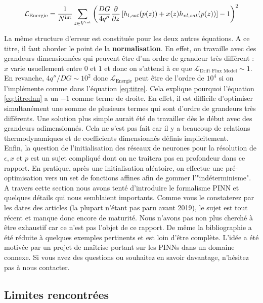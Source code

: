 \begin{equation}
    \mathcal{L}_{\text{Energie}} =\frac{1}{N^{\text{int}}}\sum_{z\in V^{\text{int}}} \left( \frac{DG}{4q''}\frac{\partial}{\partial z}\left[ h_{l,sat}(p(z)) + x(z)h_{vl,sat}(p(z)) \right] -1  \right)^2
    \label{eq:titrednn}
\end{equation}

La même structure d'erreur est constituée pour les deux autres équations. A ce titre, il faut aborder le point de la \textbf{normalisation}. En effet, on travaille avec des grandeurs dimensionnées qui peuvent être d'un ordre de grandeur très différent : $x$ varie usuellement entre $0$ et $1$ et donc on s'attend à ce que $\mathcal{L}_{\text{Drift Flux Model}}\sim 1$. En revanche, $4q''/DG \sim 10^2$ donc $\mathcal{L}_{\text{Energie}}$ peut être de l'ordre de $10^4$ si on l'implémente comme dans l'équation \ref{eq:titre}. Cela explique pourquoi l'équation \ref{eq:titrednn} a un $-1$ comme terme de droite. En effet, il est difficile d'optimiser simultanément une somme de plusieurs termes qui sont d'ordre de grandeurs très différents. Une solution plus simple aurait été de travailler dès le début avec des grandeurs adimensionnés. Cela ne s'est pas fait car il y a beaucoup de relations thermodynamiques et de coefficients dimensionnés définis implicitement.\\

Enfin, la question de l'initialisation des réseaux de neurones pour la résolution de $\epsilon, x$ et $p$ est un sujet compliqué dont on ne traitera pas en profondeur dans ce rapport. En pratique, après une initialisation aléatoire, on effectue une pré-optimisation vers un set de fonctions affines afin de gommer l'"indéterminisme".\\


A travers cette section nous avons tenté d'introduire le formalisme PINN et quelques détails qui nous semblaient importants. Comme vous le constaterez par les dates des articles (la plupart n'étant pas paru avant 2019), le sujet est tout récent et manque donc encore de maturité. Nous n'avons pas non plus cherché à être exhaustif car ce n'est pas l'objet de ce rapport. De même la bibliographie a été réduite à quelques exemples pertinents et est loin d'être complète. L'idée a été motivée par un projet de maîtrise portant sur les PINNs dans un domaine connexe. Si vous avez des questions ou souhaitez en savoir davantage, n'hésitez pas à nous contacter.

\subsection{Limites rencontrées}

